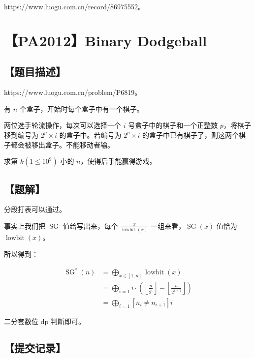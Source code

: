 \documentclass[UTF8,12pt,a4paper]{ctexart}
\begin{document}
	https://www.luogu.com.cn/record/86975552。
	
	
	\section*{【PA2012】Binary Dodgeball}
	
	\subsection*{【题目描述】}
	
	https://www.luogu.com.cn/problem/P6819。
	
	有 $n$ 个盒子，开始时每个盒子中有一个棋子。
	
	两位选手轮流操作，每次可以选择一个 $i$ 号盒子中的棋子和一个正整数 $p$，将棋子移到编号为 $2^p\times i$ 的盒子中。若编号为 $2^p\times i$ 的盒子中已有棋子了，则这两个棋子都会被移出盒子。不能移动者输。
	
	求第 $k(1\le 10^9)$ 小的 $n$，使得后手能赢得游戏。
	
	\subsection*{【题解】}
	
	分段打表可以通过。
	
	事实上我们把 $\operatorname{SG}$ 值给写出来，每个 $\frac {x}{\operatorname{lowbit}(x)}$ 一组来看，$\operatorname{SG}(x)$ 值恰为 $\operatorname{lowbit}(x)$。
	
	所以得到：
	
	$$
	\begin{aligned}
		\operatorname{SG}^{*}(n) &= \bigoplus_{x\in [1,n]} \operatorname{lowbit}(x) \\
		&= \bigoplus_{i=1} i\cdot \left( \left\lfloor\frac n{2^i} \right\rfloor - \left\lfloor\frac n{2^{i+1}} \right\rfloor \right) \\
		&= \bigoplus_{i=1} [n_i\neq n_{i+1}]i
	\end{aligned}
	$$
	
	二分套数位 dp 判断即可。
	
	\subsection*{【提交记录】}
	
\end{document}
